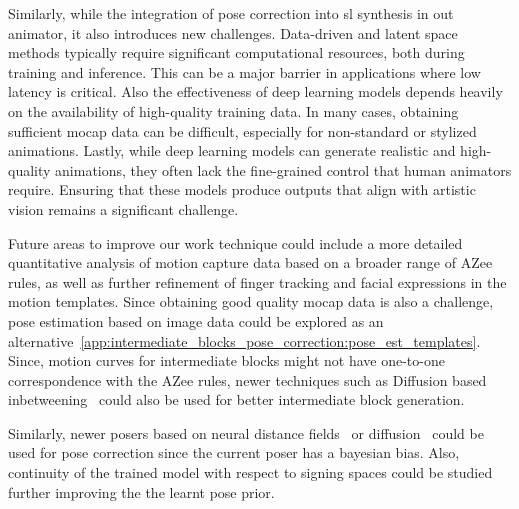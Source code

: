 \documentclass[../../main.tex]{subfiles}
\begin{document}
Similarly, while the integration of pose correction into \gls{sl} synthesis in out animator, it also introduces new challenges. Data-driven and latent space methods typically require significant computational resources, both during training and inference. This can be a major barrier in applications where low latency is critical. Also the effectiveness of deep learning models depends heavily on the availability of high-quality training data. In many cases, obtaining sufficient \gls{mocap} data can be difficult, especially for non-standard or stylized animations. Lastly, while deep learning models can generate realistic and high-quality animations, they often lack the fine-grained control that human animators require. Ensuring that these models produce outputs that align with artistic vision remains a significant challenge.

Future areas to improve our work technique could include a more detailed quantitative analysis of motion capture data based on a broader range of AZee rules, as well as further refinement of finger tracking and facial expressions in the motion templates. Since obtaining good quality \gls{mocap} data is also a challenge, pose estimation based on image data could be explored as an alternative~\ref{app:intermediate_blocks_pose_correction:pose_est_templates}. Since, motion curves for intermediate blocks might not have one-to-one correspondence with the AZee rules, newer techniques such as Diffusion based inbetweening~\cite{cohan2024flexible} could also be used for better intermediate block generation. 

Similarly, newer posers based on neural distance fields~\cite{tiwari2022pose} or diffusion~\cite{lu2023dposer} could be used for pose correction since the current poser has a bayesian bias. Also, continuity of the trained model with respect to signing spaces could be studied further improving the the learnt pose prior.
\end{document}
